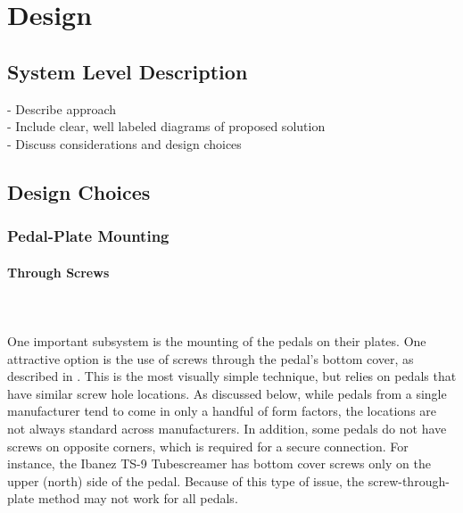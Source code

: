 \documentclass{article}
\begin{document}
\section{Design}
	\subsection{System Level Description}
	
	
	- Describe approach \\
	- Include clear, well labeled diagrams of proposed solution \\
	- Discuss considerations and design choices \\
	\subsection{Design Choices}
		\subsubsection{Pedal-Plate Mounting}
		\color{gray}
			\paragraph{Through Screws}\\\\
			One important subsystem is the mounting of the pedals on their plates.  One attractive option is the use of screws through the pedal's bottom cover, as described in \cite{ABBATE:2016}.  This is the most visually simple technique, but relies on pedals that have similar screw hole locations.  As discussed below, while pedals from a single manufacturer tend to come in only a handful of form factors, the locations are not always standard across manufacturers.  In addition, some pedals do not have screws on opposite corners, which is required for a secure connection.  For instance, the Ibanez TS-9 Tubescreamer has bottom cover screws only on the upper (north) side of the pedal.  Because of this type of issue, the screw-through-plate method may not work for all pedals.  \color{black}{
			In addition, to make use of the pedal's original screws, the plate material must be thin enough to allow the screws to pass through and still firmly grasp their threads.  This is discussed and accounted for in the choice of plate material.}\color{gray}
\end{document}
